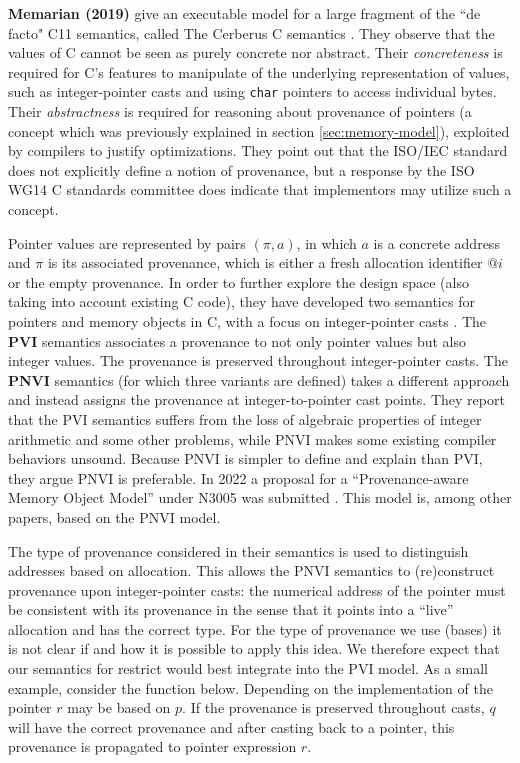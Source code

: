 \newpage

\noindent \textbf{Memarian \etall (2019)} give an executable model for a large fragment of the ``de facto" C11 semantics, called The Cerberus C semantics \cite{memarian2023cerberus}.  
They observe that the values of C cannot be seen as purely concrete nor abstract.
Their \textit{concreteness} is required for C's features to manipulate of the underlying representation of values,
such as integer-pointer casts and using \texttt{char} pointers to access individual bytes.
Their \textit{abstractness} is required for reasoning about provenance of pointers (a concept
which was previously explained in section \ref{sec:memory-model}), exploited
by compilers to justify optimizations.
They point out that the ISO/IEC standard does not explicitly define a notion of provenance,
but a response by the ISO WG14 C standards committee \cite{defect260} does indicate that implementors may utilize such a concept.

Pointer values are represented by pairs $(\pi, a)$, in which $a$ is a concrete address and $\pi$ is its associated provenance,
which is either a fresh allocation identifier $@i$ or the empty provenance.
In order to further explore the design space (also taking into account existing C code), they have developed two semantics for pointers and memory objects in C,
with a focus on integer-pointer casts \cite{memarian2019exploring}.
The \textbf{PVI} semantics associates a provenance to not only pointer values but also integer values.
The provenance is preserved throughout integer-pointer casts.
The \textbf{PNVI} semantics (for which three variants are defined) takes a different approach and instead assigns the provenance at integer-to-pointer cast points.
They report that the PVI semantics suffers from the loss of algebraic properties of integer arithmetic
and some other problems, while PNVI makes some existing compiler behaviors unsound.
Because PNVI is simpler to define and explain than PVI, they argue PNVI is preferable.
In 2022 a proposal for a ``Provenance-aware Memory Object Model'' under N3005 was submitted \cite{provmemgustedt2022}.
This model is, among other papers, based on the PNVI model.

The type of provenance considered in their semantics is used to distinguish addresses based on allocation.
This allows the PNVI semantics to (re)construct provenance upon integer-pointer casts:
the numerical address of the pointer must be consistent with its provenance in the sense that 
it points into a ``live'' allocation and has the correct type.
For the type of provenance we use (bases) it is not clear if and how it is possible
to apply this idea.
We therefore expect that our semantics for restrict would best integrate into the PVI model.
As a small example, consider the function  below.
Depending on the implementation of  the pointer $r$ may be based on $p$.
If the provenance is preserved throughout casts, $q$ will have the correct provenance
and after casting back to a pointer, this provenance is propagated to pointer expression $r$.

